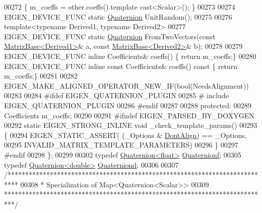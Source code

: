 \begin{DoxyCode}
00272   \{ m\_coeffs = other.coeffs().template cast<Scalar>(); \}
00273 
00274   EIGEN\_DEVICE\_FUNC \textcolor{keyword}{static} \hyperlink{group___geometry___module_class_eigen_1_1_quaternion}{Quaternion} UnitRandom();
00275 
00276   \textcolor{keyword}{template}<\textcolor{keyword}{typename} Derived1, \textcolor{keyword}{typename} Derived2>
00277   EIGEN\_DEVICE\_FUNC \textcolor{keyword}{static} \hyperlink{group___geometry___module_class_eigen_1_1_quaternion}{Quaternion} FromTwoVectors(\textcolor{keyword}{const} 
      \hyperlink{group___core___module_class_eigen_1_1_matrix_base}{MatrixBase<Derived1>}& a, \textcolor{keyword}{const} \hyperlink{group___core___module_class_eigen_1_1_matrix_base}{MatrixBase<Derived2>}& b);
00278 
00279   EIGEN\_DEVICE\_FUNC \textcolor{keyword}{inline} Coefficients& coeffs() \{ \textcolor{keywordflow}{return} m\_coeffs;\}
00280   EIGEN\_DEVICE\_FUNC \textcolor{keyword}{inline} \textcolor{keyword}{const} Coefficients& coeffs()\textcolor{keyword}{ const }\{ \textcolor{keywordflow}{return} m\_coeffs;\}
00281 
00282   EIGEN\_MAKE\_ALIGNED\_OPERATOR\_NEW\_IF(\textcolor{keywordtype}{bool}(NeedsAlignment))
00283   
00284 \textcolor{preprocessor}{#ifdef EIGEN\_QUATERNION\_PLUGIN}
00285 \textcolor{preprocessor}{# include EIGEN\_QUATERNION\_PLUGIN}
00286 \textcolor{preprocessor}{#endif}
00287 
00288 \textcolor{keyword}{protected}:
00289   Coefficients m\_coeffs;
00290   
00291 \textcolor{preprocessor}{#ifndef EIGEN\_PARSED\_BY\_DOXYGEN}
00292     \textcolor{keyword}{static} EIGEN\_STRONG\_INLINE \textcolor{keywordtype}{void} \_check\_template\_params()
00293     \{
00294       EIGEN\_STATIC\_ASSERT( (\_Options & \hyperlink{group__enums_ggaacded1a18ae58b0f554751f6cdf9eb13a40a452614141522dd313363dbbd65726}{DontAlign}) == \_Options,
00295         INVALID\_MATRIX\_TEMPLATE\_PARAMETERS)
00296     \}
00297 \textcolor{preprocessor}{#endif}
00298 \};
00299 
00302 \textcolor{keyword}{typedef} \hyperlink{group___geometry___module_class_eigen_1_1_quaternion}{Quaternion<float>} \hyperlink{group___geometry___module_ga785b13a5a87f9bf55d4eba51ead2dcf0}{Quaternionf};
00305 \textcolor{keyword}{typedef} \hyperlink{group___geometry___module_class_eigen_1_1_quaternion}{Quaternion<double>} \hyperlink{group___geometry___module_ga6e77eb8b6aae0e04be2db88107dbc642}{Quaterniond};
00306 
00307 \textcolor{comment}{/***************************************************************************}
00308 \textcolor{comment}{* Specialization of Map<Quaternion<Scalar>>}
00309 \textcolor{comment}{***************************************************************************/}

\end{DoxyCode}
